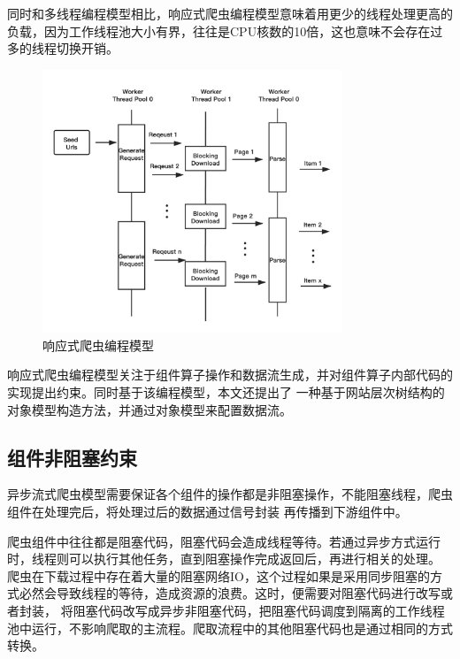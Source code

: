 \documentclass[master]{njuthesis}
\begin{document}
同时和多线程编程模型相比，响应式爬虫编程模型意味着用更少的线程处理更高的负载，因为工作线程池大小有界，往往是CPU核数的10倍，这也意味不会存在过多的线程切换开销。



\begin{figure}[htbp]
\centering
\includegraphics[width= 0.8\textwidth]{pic/reactive-crawler.png}
\caption{响应式爬虫编程模型}\label{fig:crawler}
\end{figure}




响应式爬虫编程模型关注于组件算子操作和数据流生成，并对组件算子内部代码的实现提出约束。同时基于该编程模型，本文还提出了
一种基于网站层次树结构的对象模型构造方法，并通过对象模型来配置数据流。



\subsection{组件非阻塞约束}
异步流式爬虫模型需要保证各个组件的操作都是非阻塞操作，不能阻塞线程，爬虫组件在处理完后，将处理过后的数据通过信号封装
再传播到下游组件中。

爬虫组件中往往都是阻塞代码，阻塞代码会造成线程等待。若通过异步方式运行时，线程则可以执行其他任务，直到阻塞操作完成返回后，再进行相关的处理。
爬虫在下载过程中存在着大量的阻塞网络IO，这个过程如果是采用同步阻塞的方式必然会导致线程的等待，造成资源的浪费。这时，便需要对阻塞代码进行改写或者封装，
将阻塞代码改写成异步非阻塞代码，把阻塞代码调度到隔离的工作线程池中运行，不影响爬取的主流程。爬取流程中的其他阻塞代码也是通过相同的方式转换。
\end{document}
